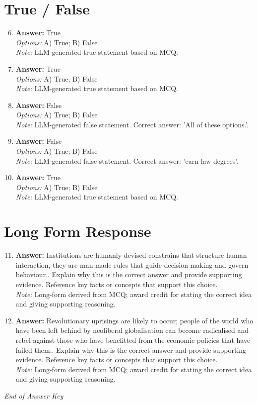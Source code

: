 \documentclass[12pt]{article}
\begin{document}
\section*{True / False}
\begin{enumerate}[label=\arabic*.]
\setcounter{enumi}{5}
\item \textbf{Answer:} True
\\ \textit{Options:} A) True; B) False
\\ \textit{Note:} LLM-generated true statement based on MCQ.
\item \textbf{Answer:} True
\\ \textit{Options:} A) True; B) False
\\ \textit{Note:} LLM-generated true statement based on MCQ.
\item \textbf{Answer:} False
\\ \textit{Options:} A) True; B) False
\\ \textit{Note:} LLM-generated false statement. Correct answer: 'All of these options.'.
\item \textbf{Answer:} False
\\ \textit{Options:} A) True; B) False
\\ \textit{Note:} LLM-generated false statement. Correct answer: 'earn law degrees'.
\item \textbf{Answer:} True
\\ \textit{Options:} A) True; B) False
\\ \textit{Note:} LLM-generated true statement based on MCQ.
\end{enumerate}

\section*{Long Form Response}
\begin{enumerate}[label=\arabic*.]
\setcounter{enumi}{10}
\item \textbf{Answer:} Institutions are humanly devised constrains that structure human interaction, they are man-made rules that guide decision making and govern behaviour.. Explain why this is the correct answer and provide supporting evidence. Reference key facts or concepts that support this choice.
\\ \textit{Note:} Long-form derived from MCQ; award credit for stating the correct idea and giving supporting reasoning.
\item \textbf{Answer:} Revolutionary uprisings are likely to occur; people of the world who have been left behind by neoliberal globalisation can become radicalised and rebel against those who have benefitted from the economic policies that have failed them.. Explain why this is the correct answer and provide supporting evidence. Reference key facts or concepts that support this choice.
\\ \textit{Note:} Long-form derived from MCQ; award credit for stating the correct idea and giving supporting reasoning.
\end{enumerate}

\vfill
\noindent\textit{End of Answer Key}
\end{document}
